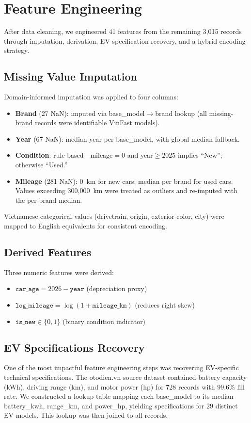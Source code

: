 \documentclass[lettersize,journal]{IEEEtran}
\begin{document}
\section{Feature Engineering}

After data cleaning, we engineered 41 features from the remaining 3,015
records through imputation, derivation, EV specification recovery, and a
hybrid encoding strategy.

\subsection{Missing Value Imputation}
Domain-informed imputation was applied to four columns:
\begin{itemize}
    \item \textbf{Brand} (27 NaN): imputed via base\_model$\to$brand lookup
    (all missing-brand records were identifiable VinFast models).
    \item \textbf{Year} (67 NaN): median year per base\_model, with global
    median fallback.
    \item \textbf{Condition}: rule-based---mileage$= 0$ and year$\geq 2025$
    implies ``New''; otherwise ``Used.''
    \item \textbf{Mileage} (281 NaN): 0~km for new cars; median per brand
    for used cars. Values exceeding 300,000~km were treated as outliers and
    re-imputed with the per-brand median.
\end{itemize}

Vietnamese categorical values (drivetrain, origin, exterior color, city) were
mapped to English equivalents for consistent encoding.

\subsection{Derived Features}
Three numeric features were derived:
\begin{itemize}
    \item $\texttt{car\_age} = 2026 - \texttt{year}$ (depreciation proxy)
    \item $\texttt{log\_mileage} = \log(1 + \texttt{mileage\_km})$ (reduces
    right skew)
    \item $\texttt{is\_new} \in \{0, 1\}$ (binary condition indicator)
\end{itemize}

\subsection{EV Specifications Recovery}
One of the most impactful feature engineering steps was recovering
EV-specific technical specifications. The otodien.vn source dataset contained
battery capacity (kWh), driving range (km), and motor power (hp) for 728
records with 99.6\% fill rate. We constructed a lookup table mapping each
base\_model to its median battery\_kwh, range\_km, and power\_hp, yielding
specifications for 29 distinct EV models. This lookup was then joined to all
records.
\end{document}

